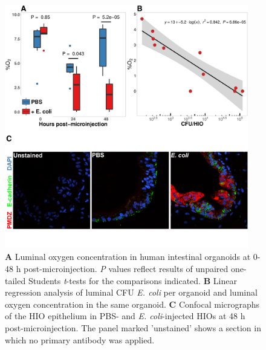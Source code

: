 \documentclass[9pt,lineo]{elife}
\begin{document}
\begin{figure}
\begin{fullwidth}
\centering
\includegraphics[width=0.95\textwidth]{./figures/figure3/figure3_multipanel.pdf}
\caption{\textbf{A} Luminal oxygen concentration in human intestinal organoids at 0-48 h post-microinjection. \textit{P} values reflect results of unpaired one-tailed Students \textit{t}-tests for the comparisons indicated. \textbf{B} Linear regression analysis of luminal CFU \textit{E. coli} per organoid and luminal oxygen concentration in the same organoid. \textbf{C} Confocal micrographs of the HIO epithelium in PBS- and \textit{E. coli}-injected HIOs at 48 h post-microinjection. The panel marked 'unstained' shows a section in which no primary antibody was applied.}
\label{fig:fullwidth}
\end{fullwidth}
\end{figure}
\end{document}
